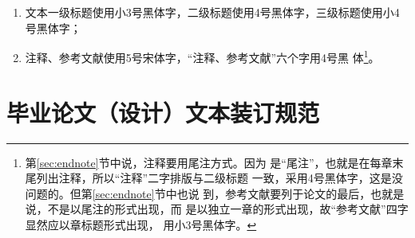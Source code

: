 \begin{enumerate}
\begin{enumerate}
{      就行了。}；公式字体、字号与正文相同；
  \item 文本一级标题使用小3号黑体字，二级标题使用4号黑体字，三级标题使用小4号黑体字；
  \item 注释、参考文献使用5号宋体字，“注释、参考文献”六个字用4号黑
    体{\bug}\footnote{第\ref{sec:endnote}节中说，注释要用尾注方式。因为
      是“尾注”，也就是在每章末尾列出注释，所以“注释”二字排版与二级标题
      一致，采用4号黑体字，这是没问题的。但第\ref{sec:endnote}节中也说
      到，参考文献要列于论文的最后，也就是说，不是以尾注的形式出现，而
      是以独立一章的形式出现，故“参考文献”四字显然应以章标题形式出现，
      用小3号黑体字。}。
  \end{enumerate}
\end{enumerate}

\section{毕业论文（设计）文本装订规范}

